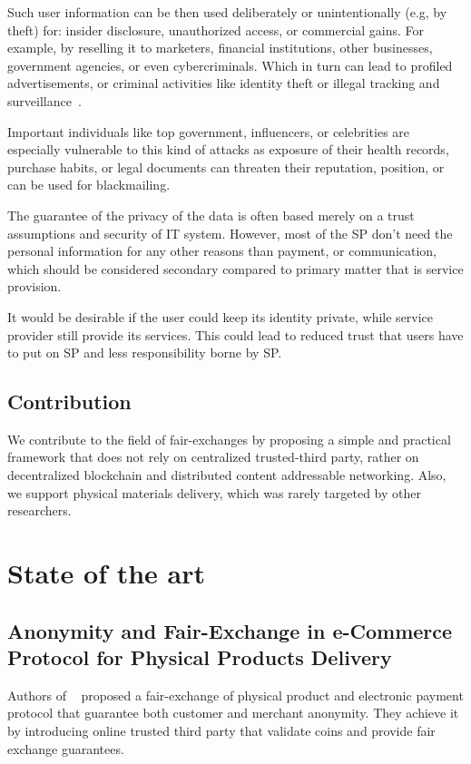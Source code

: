 \documentclass{article}
\begin{document}
Such user information can be then used deliberately or unintentionally (e.g, by theft) for: insider disclosure, unauthorized access, or commercial gains. For example, by reselling it to marketers, financial institutions, other businesses, government agencies, or even cybercriminals. Which in turn can lead to profiled advertisements, or criminal activities like identity theft or illegal tracking and surveillance~\cite{smith2011information}.

Important individuals like top government, influencers, or celebrities are especially vulnerable to this kind of attacks as exposure of their health records, purchase habits, or legal documents can threaten their reputation, position, or can be used for blackmailing.

The guarantee of the privacy of the data is often based merely on a trust assumptions and security of IT system. However, most of the SP don't need the personal information for any other reasons than payment, or communication, which should be considered secondary compared to primary matter that is service provision.

It would be desirable if the user could keep its identity private, while service provider still provide its services. This could lead to reduced trust that users have to put on SP and less responsibility borne by SP.

\subsection{Contribution}
We contribute to the field of fair-exchanges by proposing a simple and practical framework that does not rely on centralized trusted-third party, rather on decentralized blockchain and distributed content addressable networking. 
Also, we support physical materials delivery, which was rarely targeted by other researchers.

\section{State of the art}
\subsection{Anonymity and Fair-Exchange in e-Commerce Protocol for Physical Products Delivery}

Authors of ~\cite{birjoveanu2015anonymity} proposed a fair-exchange of physical product and electronic payment protocol that guarantee both customer and merchant anonymity. They achieve it by introducing online trusted third party that validate coins and provide fair exchange guarantees.
\end{document}
